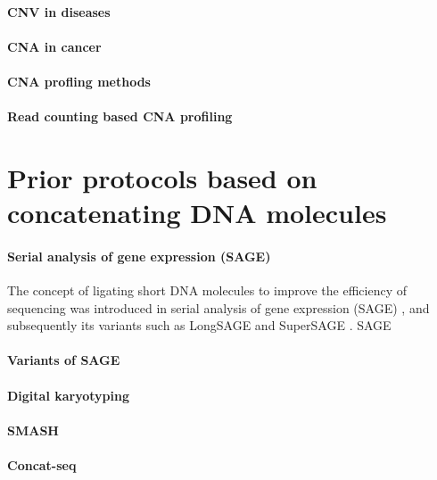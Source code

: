 \paragraph{CNV in diseases}

\paragraph{CNA in cancer}




\paragraph{CNA profling methods}


\paragraph{Read counting based CNA profiling}



\section{Prior protocols based on concatenating DNA molecules}
\paragraph{Serial analysis of gene expression (SAGE)}
The concept of ligating short DNA molecules to improve the efficiency
of sequencing was introduced in serial analysis of gene expression
(SAGE) \citep{}, and subsequently its variants such as LongSAGE and
SuperSAGE \citep{}. SAGE

\paragraph{Variants of SAGE}

\paragraph{Digital karyotyping}

\paragraph{SMASH}

\paragraph{Concat-seq}

